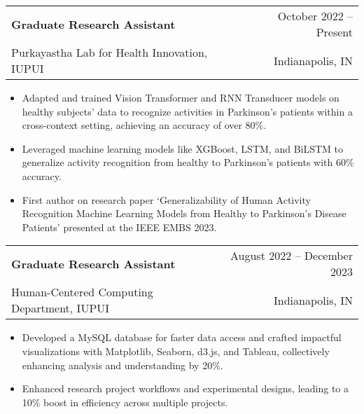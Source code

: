 \documentclass[letterpaper,11pt]{article}
\makeatletter
\newcommand{\resumeItem}[1]{
  \item\small{
    {#1 \vspace{-2pt}}
  }
}
\newcommand{\resumeSubheading}[4]{
  \vspace{-2pt}\item
    \begin{tabular*}{0.97\textwidth}[t]{l@{\extracolsep{\fill}}r}
      \textbf{#1} & #2 \\
    \small#3 & \small #4 \\
    \end{tabular*}\vspace{-7pt}
}
\newcommand{\resumeItemListStart}{\begin{itemize}}
\newcommand{\resumeItemListEnd}{\end{itemize}\vspace{-5pt}}
\makeatother
\begin{document}
    \resumeSubheading
      {Graduate Research Assistant}{October 2022 -- Present}
      {Purkayastha Lab for Health Innovation, IUPUI}{Indianapolis, IN}
      \resumeItemListStart
        \resumeItem{Adapted and trained Vision Transformer and RNN Transducer models on healthy subjects' data to recognize activities in Parkinson's patients within a cross-context setting, achieving an accuracy of over 80\%.}
        \resumeItem{Leveraged machine learning models like XGBoost, LSTM, and BiLSTM to generalize activity recognition from healthy to Parkinson's patients with 60\% accuracy.}
    
        \resumeItem{First author on research paper ‘Generalizability of Human Activity Recognition Machine Learning Models from Healthy to Parkinson's Disease Patients’ presented at the IEEE EMBS 2023.}
    \resumeItemListEnd

    \resumeSubheading
      {Graduate Research Assistant}{August 2022 -- December 2023}
      {Human-Centered Computing Department, IUPUI}{Indianapolis, IN}
      \resumeItemListStart
        \resumeItem{Developed a MySQL database for faster data access and crafted impactful visualizations with Matplotlib, Seaborn, d3.js, and Tableau, collectively enhancing analysis and understanding by 20\%.}
        \resumeItem{Enhanced research project workflows and experimental designs, leading to a 10\% boost in efficiency across multiple projects.}
      \resumeItemListEnd
\end{document}
